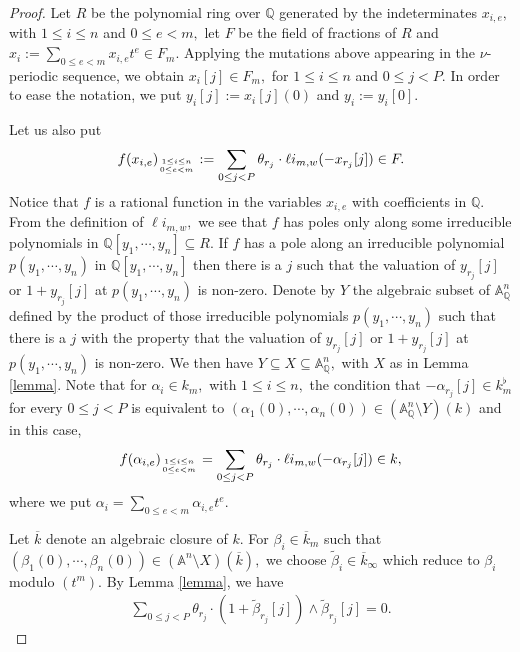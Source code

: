 \documentclass{amsart}
\theoremstyle{definition}
\numberwithin{equation}{subsection}
\begin{document}
\begin{proof}  

Let $R$ be the polynomial ring over  $\mathbb{Q}$ generated by the indeterminates $x _{i,e},$ with $1 \leq i \leq n$ and $0\leq e <m,$ let $F$ be the field of fractions of $R$   and $x_i := \sum _{0 \leq e <m} x _{i,e}t^e \in F_m.$ Applying the mutations above appearing in the $\nu$-periodic sequence, we obtain $x_{i}[j] \in F_{m},$ for $1\leq i\leq n$ and $0\leq j<P.$  In order to ease the notation, we put $y_{i}[j]:=x _{i}[j](0)$ and $y_i:=y_{i}[0].$

Let us also put
$$
f(x_{i,e})_{{1\leq i \leq n} \atop {0\leq e <m}} :=   \sum _{0\leq j <P} \theta_{r_j}\cdot \ell i _{m,w}(-x_{r_j}[j]) \in F.
$$
Notice that $f$ is a rational function in the variables $x_{i,e}$ with coefficients in $\mathbb{Q}.$  From the definition of $\ell i_{m,w},$ we see that $f$  has poles only along some irreducible polynomials in $\mathbb{Q}[y_1,\cdots, y_n] \subseteq R.$ 
If $f$ has a pole along an irreducible polynomial $p(y_1,\cdots,y_n)$ in $\mathbb{Q}[y_1,\cdots, y_n]$ then 
there is a $j$  such that the valuation of $y_{r_j}[j]$ or $1+y_{r_j}[j]$ at $p(y_1,\cdots, y_n)$ is non-zero. Denote by $Y$ the algebraic subset of $\mathbb{A}^{n}_{\mathbb{Q}}$ defined by the product of those irreducible polynomials $p(y_{1},\cdots, y_{n})$  such that there is a $j$  with the property that the valuation of $y_{r_j}[j]$ or $1+y_{r_j}[j]$ at $p(y_1,\cdots, y_n)$ is non-zero. We then  have $Y \subseteq X \subseteq \mathbb{A}^{n} _{\mathbb{Q}},$ with $X$ as in Lemma \ref{lemma}. Note that for $\alpha _{i} \in k_{m},$ with $1 \leq i \leq n,$ the condition that $-\alpha _{r_j}[j] \in k_{m} ^{\flat}$ for every $0\leq j<P$ is equivalent to  $(\alpha_{1}(0), \cdots, \alpha _{n}(0) ) \in (\mathbb{A}^{n}_{\mathbb{Q}} \setminus Y)(k)$ and in this case, 
\begin{align}\label{rational-eqn}
  f(\alpha_{i,e})_{{1\leq i \leq n} \atop {0\leq e <m}} =   \sum _{0\leq j <P} \theta_{r_j}\cdot \ell i _{m,w}(-\alpha_{r_j}[j]) \in k,  
\end{align}
where we put $\alpha_{i}=\sum _{0\leq e<m}\alpha_{i,e}t^e.$



Let $\overline{k}$ denote an algebraic closure of $k.$  For $\beta _{i} \in \overline{k}_m$ such that $(\beta_1(0),\cdots, \beta_{n}(0)) \in (\mathbb{A} ^n \setminus X)(\overline{k}),$ we choose  $\tilde{\beta}_{i} \in \overline{k}_{\infty} $ which reduce to  $\beta _i$ modulo $(t^m).$ By  Lemma \ref{lemma}, we have
\begin{eqnarray}\label{theta-eqn}
  \sum_{0\leq j <P}\theta _{r_{j}}\cdot (1+\tilde{\beta} _{r_j}[j]) \wedge \tilde{\beta} _{r_j}[j]=0.     
\end{eqnarray}


\end{proof}
\end{document}
